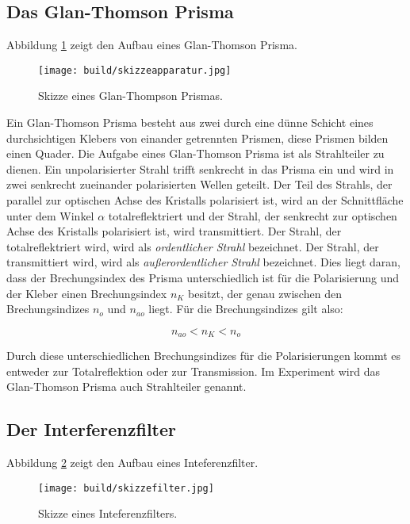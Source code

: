\subsection{Das Glan-Thomson Prisma}
\label{sec:Prisma}

Abbildung \ref{fig:Prisma} zeigt den Aufbau eines Glan-Thomson Prisma.

\begin{figure}[H]
    \centering
    \texttt{[image: build/skizzeapparatur.jpg]}
    \caption{Skizze eines Glan-Thompson Prismas.}
    \label{fig:Prisma}
\end{figure}

Ein Glan-Thomson Prisma besteht aus zwei durch eine dünne Schicht eines durchsichtigen Klebers von einander getrennten Prismen, diese Prismen bilden einen Quader. Die Aufgabe eines Glan-Thomson Prisma ist als Strahlteiler zu dienen. Ein unpolarisierter Strahl trifft senkrecht in das Prisma ein und wird in zwei senkrecht zueinander polarisierten Wellen geteilt. Der Teil des Strahls, der parallel zur optischen Achse des Kristalls polarisiert ist, wird an der Schnittfläche unter dem Winkel $\alpha$ totalreflektriert und der Strahl, der senkrecht zur optischen Achse des Kristalls polarisiert ist, wird transmittiert. Der Strahl, der totalreflektriert wird, wird als \textit{ordentlicher Strahl} bezeichnet. Der Strahl, der transmittiert wird, wird als \textit{außerordentlicher Strahl} bezeichnet. Dies liegt daran, dass der Brechungsindex des Prisma unterschiedlich ist für die Polarisierung und der Kleber einen Brechungsindex $n_K$ besitzt, der genau zwischen den Brechungsindizes $n_o$ und $n_{ao}$ liegt. Für die Brechungsindizes gilt also:

\begin{equation*}
    n_{ao} < n_K < n_o
\end{equation*}

Durch diese unterschiedlichen Brechungsindizes für die Polarisierungen kommt es entweder zur Totalreflektion oder zur Transmission. Im Experiment wird das Glan-Thomson Prisma auch Strahlteiler genannt. 

\subsection{Der Interferenzfilter}
\label{sec:Filter}

Abbildung \ref{fig:Filter} zeigt den Aufbau eines Inteferenzfilter.

\begin{figure}[H]
    \centering
    \texttt{[image: build/skizzefilter.jpg]}
    \caption{Skizze eines Inteferenzfilters.}
    \label{fig:Filter}
\end{figure}

